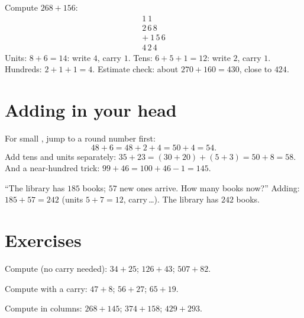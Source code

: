 \begin{example}\label{ex:g2:addition:worked}
Compute $268 + 156$:
\[
\begin{array}{r}
{\scriptstyle 1}\ {\scriptstyle 1}\ \phantom{0} \\[-3pt]
2\,6\,8 \\
+\ 1\,5\,6 \\
\hline
4\,2\,4
\end{array}
\]
Units: $8 + 6 = 14$: write $4$, carry $1$. Tens:
$6 + 5 + 1 = 12$: write $2$, carry $1$. Hundreds:
$2 + 1 + 1 = 4$. Estimate check: about $270 + 160 = 430$, close to
$424$. \checkmark
\end{example}

\section{Adding in your head}

\begin{example}\label{ex:g2:addition:mental}
For small , jump to a round number first:
\[
48 + 6 = 48 + 2 + 4 = 50 + 4 = 54 .
\]
Add tens and units separately:
$35 + 23 = (30 + 20) + (5 + 3) = 50 + 8 = 58$. And a near-hundred
trick: $99 + 46 = 100 + 46 - 1 = 145$.
\end{example}

\begin{example}\label{ex:g2:addition:problem}
``The library has $185$ books; $57$ new ones arrive. How many books
now?'' Adding: $185 + 57 = 242$ (units $5 + 7 = 12$, carry\,\dots).
The library has $242$ books.
\end{example}

\section{Exercises}

\begin{exercise}[$\star$]\label{exo:g2:addition:1}
Compute (no carry needed): $34 + 25$; \quad $126 + 43$; \quad
$507 + 82$.
\end{exercise}

\begin{exercise}[$\star$]\label{exo:g2:addition:2}
Compute with a carry: $47 + 8$; \quad $56 + 27$; \quad $65 + 19$.
\end{exercise}

\begin{exercise}[$\star$]\label{exo:g2:addition:3}
Compute in columns: $268 + 145$; \quad $374 + 158$; \quad
$429 + 293$.
\end{exercise}

